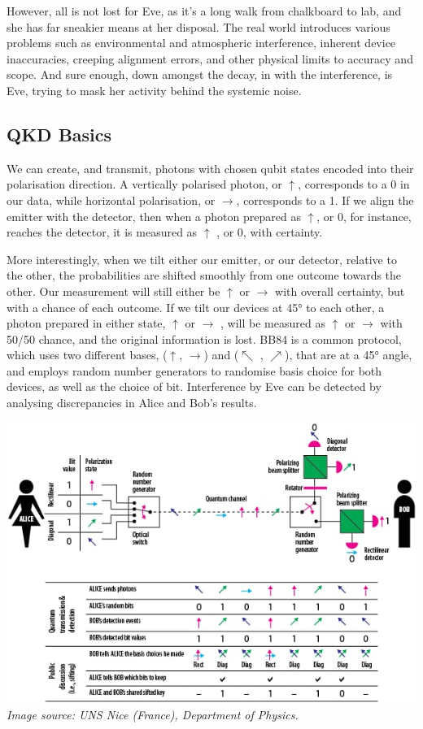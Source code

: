 \documentclass[journal]{vgtc}
\begin{document}
However, all is not lost for Eve, as it's a long walk from chalkboard to lab, and she has far sneakier means at her disposal. The real world introduces various problems such as environmental and atmospheric interference, inherent device inaccuracies, creeping alignment errors, and other physical limits to accuracy and scope. And sure enough, down amongst the decay, in with the interference, is Eve, trying to mask her activity behind the systemic noise.

\begin{tcolorbox}
\section*{QKD Basics}

We can create, and transmit, photons with chosen qubit states encoded into their polarisation direction. A vertically polarised photon, or $\uparrow$, corresponds to a 0 in our data, while horizontal polarisation, or $\rightarrow$, corresponds to a 1. If we align the emitter with the detector, then when a photon prepared as $\uparrow$, or 0, for instance, reaches the detector, it is measured as $\uparrow$ , or 0, with certainty.

More interestingly, when we tilt either our emitter, or our detector, relative to the other, the probabilities are shifted smoothly from one outcome towards the other. Our measurement will still either be $\uparrow$ or $\rightarrow$ with overall certainty, but with a chance of each outcome. If we tilt our devices at \ang{45} to each other, a photon prepared in either state, $\uparrow$ or $\rightarrow$ , will be measured as $\uparrow$ or $\rightarrow$ with 50/50 chance, and the original information is lost. BB84 is a common protocol, which uses two different bases, ($\uparrow$, $\rightarrow$) and ($\nwarrow$ , $\nearrow$), that are at a \ang{45} angle, and employs random number generators to randomise basis choice for both devices, as well as the choice of bit. Interference by Eve can be detected by analysing discrepancies in Alice and Bob's results. 

\includegraphics[width=\linewidth]{Box_2}
\textit{Image source: UNS Nice (France), Department of Physics.}

\end{tcolorbox}
\end{document}
